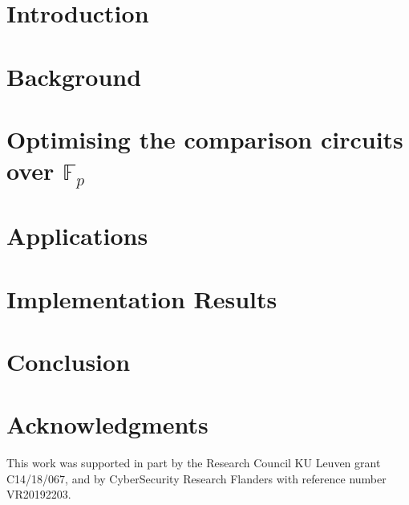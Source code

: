 \documentclass[USenglish,oneside,twocolumn]{article}
\theoremstyle{remark}
\begin{document}
\section{Introduction}
\label{sec:introduction}


\section{Background}
\label{sec:background}


% 

\section{Optimising the comparison circuits over $\mathbb{F}_p$}
\label{sec:comparison-circuit}



\section{Applications}
\label{sec:applications}


\section{Implementation Results}
\label{sec:impl-results}


% 

\section{Conclusion}


\section*{Acknowledgments}
This work was supported in part by the Research Council KU Leuven grant C14/18/067, and by CyberSecurity Research Flanders with reference number VR20192203.




\appendix

\end{document}
